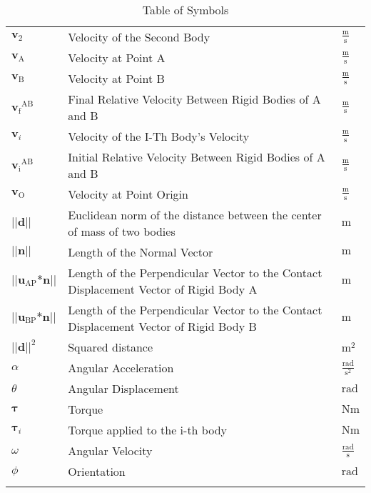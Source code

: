 \documentclass[12pt]{article}
\begin{document}
\begin{longtabu}{l X[l] l}
${\mathbf{v}_{2}}$ & Velocity of the Second Body & $\frac{\text{m}}{\text{s}}$
\\
${\mathbf{v}_{\text{A}}}$ & Velocity at Point A & $\frac{\text{m}}{\text{s}}$
\\
${\mathbf{v}_{\text{B}}}$ & Velocity at Point B & $\frac{\text{m}}{\text{s}}$
\\
${{\mathbf{v}_{\text{f}}}^{\text{A}\text{B}}}$ & Final Relative Velocity Between Rigid Bodies of A and B & $\frac{\text{m}}{\text{s}}$
\\
${\mathbf{v}_{i}}$ & Velocity of the I-Th Body's Velocity & $\frac{\text{m}}{\text{s}}$
\\
${{\mathbf{v}_{\text{i}}}^{\text{A}\text{B}}}$ & Initial Relative Velocity Between Rigid Bodies of A and B & $\frac{\text{m}}{\text{s}}$
\\
${\mathbf{v}_{\text{O}}}$ & Velocity at Point Origin & $\frac{\text{m}}{\text{s}}$
\\
$\text{||}\mathbf{d}\text{||}$ & Euclidean norm of the distance between the center of mass of two bodies & ${\text{m}}$
\\
$\text{||}\mathbf{n}\text{||}$ & Length of the Normal Vector & ${\text{m}}$
\\
$\text{||}{\mathbf{u}_{\text{A}\text{P}}}\text{*}\mathbf{n}\text{||}$ & Length of the Perpendicular Vector to the Contact Displacement Vector of Rigid Body A & ${\text{m}}$
\\
$\text{||}{\mathbf{u}_{\text{B}\text{P}}}\text{*}\mathbf{n}\text{||}$ & Length of the Perpendicular Vector to the Contact Displacement Vector of Rigid Body B & ${\text{m}}$
\\
${\text{||}\mathbf{d}\text{||}^{2}}$ & Squared distance & ${\text{m}^{2}}$
\\
$α$ & Angular Acceleration & $\frac{\text{rad}}{\text{s}^{2}}$
\\
$θ$ & Angular Displacement & ${\text{rad}}$
\\
$\mathbf{τ}$ & Torque & $\text{N}\text{m}$
\\
${\mathbf{τ}_{i}}$ & Torque applied to the i-th body & $\text{N}\text{m}$
\\
$ω$ & Angular Velocity & $\frac{\text{rad}}{\text{s}}$
\\
$ϕ$ & Orientation & ${\text{rad}}$
\\
\bottomrule
\caption{Table of Symbols}
\label{Table:ToS}
\end{longtabu}
\end{document}
